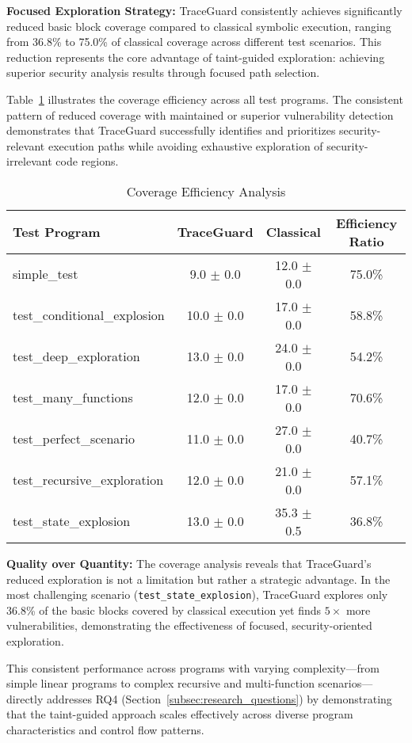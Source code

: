 \textbf{Focused Exploration Strategy:} TraceGuard consistently achieves significantly reduced basic block coverage compared to classical symbolic execution, ranging from 36.8\% to 75.0\% of classical coverage across different test scenarios. This reduction represents the core advantage of taint-guided exploration: achieving superior security analysis results through focused path selection.

Table~\ref{tab:coverage_efficiency} illustrates the coverage efficiency across all test programs. The consistent pattern of reduced coverage with maintained or superior vulnerability detection demonstrates that TraceGuard successfully identifies and prioritizes security-relevant execution paths while avoiding exhaustive exploration of security-irrelevant code regions.

\begin{table}[htbp]
\centering
\caption{Coverage Efficiency Analysis}
\label{tab:coverage_efficiency}
\begin{tabular}{lccc}
\toprule
\textbf{Test Program} & \textbf{TraceGuard} & \textbf{Classical} & \textbf{Efficiency Ratio} \\
\midrule
simple\_test & 9.0 $\pm$ 0.0 & 12.0 $\pm$ 0.0 & 75.0\% \\
test\_conditional\_explosion & 10.0 $\pm$ 0.0 & 17.0 $\pm$ 0.0 & 58.8\% \\
test\_deep\_exploration & 13.0 $\pm$ 0.0 & 24.0 $\pm$ 0.0 & 54.2\% \\
test\_many\_functions & 12.0 $\pm$ 0.0 & 17.0 $\pm$ 0.0 & 70.6\% \\
test\_perfect\_scenario & 11.0 $\pm$ 0.0 & 27.0 $\pm$ 0.0 & 40.7\% \\
test\_recursive\_exploration & 12.0 $\pm$ 0.0 & 21.0 $\pm$ 0.0 & 57.1\% \\
test\_state\_explosion & 13.0 $\pm$ 0.0 & 35.3 $\pm$ 0.5 & 36.8\% \\
\bottomrule
\end{tabular}
\end{table}

\textbf{Quality over Quantity:} The coverage analysis reveals that TraceGuard's reduced exploration is not a limitation but rather a strategic advantage. In the most challenging scenario (\texttt{test\_state\_explosion}), TraceGuard explores only 36.8\% of the basic blocks covered by classical execution yet finds $5 \times$ more vulnerabilities, demonstrating the effectiveness of focused, security-oriented exploration.

This consistent performance across programs with varying complexity---from simple linear programs to complex recursive and multi-function scenarios---directly addresses RQ4 (Section~\ref{subsec:research_questions}) by demonstrating that the taint-guided approach scales effectively across diverse program characteristics and control flow patterns.

